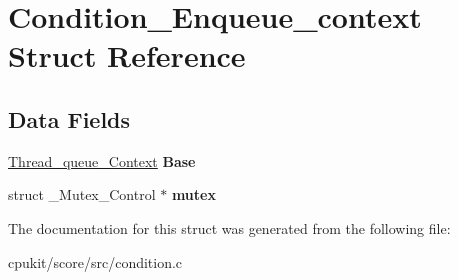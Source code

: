 \hypertarget{structCondition__Enqueue__context}{}\section{Condition\+\_\+\+Enqueue\+\_\+context Struct Reference}
\label{structCondition__Enqueue__context}
\subsection*{Data Fields}
\begin{DoxyCompactItemize}
\item 
\mbox{\label{structCondition__Enqueue__context_af029f674f0517ee5418285a74e46e5b3}} 
\mbox{\hyperlink{structThread__queue__Context}{Thread\+\_\+queue\+\_\+\+Context}} {\bfseries Base}
\item 
\mbox{\label{structCondition__Enqueue__context_afb20e9fe71f509abf9536cf7d802711f}} 
struct \+\_\+\+Mutex\+\_\+\+Control $\ast$ {\bfseries mutex}
\end{DoxyCompactItemize}


The documentation for this struct was generated from the following file\+:\begin{DoxyCompactItemize}
\item 
cpukit/score/src/condition.\+c\end{DoxyCompactItemize}
